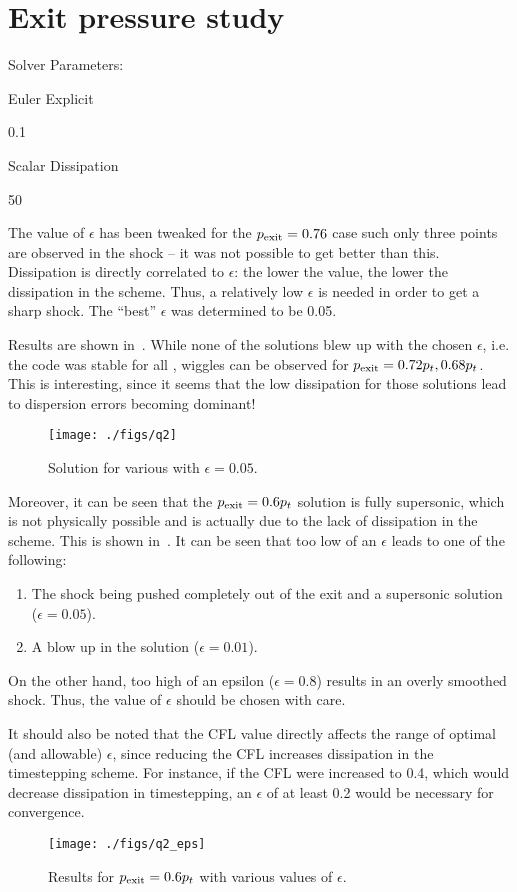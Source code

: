 \section{Exit pressure study}
Solver Parameters:
\begin{description}[noitemsep]
    \item[Timestepping Scheme:] Euler Explicit
    \item[CFL:] 0.1
    \item[Spatial Scheme:] Scalar Dissipation
    \item[Grid Points:] 50
\end{description}
The value of $\epsilon$ has been tweaked for the $p_{\mathrm{exit}} = 0.76$ case such only three points
are observed in the shock -- it was not possible to get better than this. Dissipation
is directly correlated to $\epsilon$: the lower the value, the lower the dissipation in the
scheme. Thus, a relatively low $\epsilon$ is needed in order to get a sharp shock. The
``best'' $\epsilon$ was determined to be 0.05.

Results are shown in~. While none of the solutions blew up with the chosen
$\epsilon$, i.e. the code was stable for all \pexit, wiggles can be observed for
$p_{\mathrm{exit}} = 0.72p_t, 0.68p_t$. This is interesting, since it seems that the low dissipation
for those solutions lead to dispersion errors becoming dominant!
\begin{figure}
    \centering
    \texttt{[image: ./figs/q2]}
    \caption{Solution for various \pexit with $\epsilon = 0.05$.}\label{fig:q2}
\end{figure}

Moreover, it can be seen that the $p_{\mathrm{exit}} = 0.6p_t$ solution is fully supersonic, which
is not physically possible and is actually due to the lack of dissipation in the scheme.
This is shown in~. It can be seen that too low of an $\epsilon$ leads to
one of the following:
\begin{enumerate}
    \item The shock being pushed completely out of the exit and a supersonic solution
        ($\epsilon = 0.05$).
    \item A blow up in the solution ($\epsilon = 0.01$).
\end{enumerate}
On the other hand, too high of an epsilon ($\epsilon = 0.8$) results in an overly smoothed
shock. Thus, the value of $\epsilon$ should be chosen with care.

It should also be noted that the CFL value directly affects the range of
optimal (and allowable) $\epsilon$, since reducing the CFL increases dissipation
in the timestepping scheme. For instance, if the CFL were increased to 0.4, which would
decrease dissipation in timestepping, an $\epsilon$ of at least 0.2 would be necessary
for convergence.
\begin{figure}
    \centering
    \texttt{[image: ./figs/q2\_eps]}
    \caption{Results for $p_{\mathrm{exit}} = 0.6p_t$ with various values of $\epsilon$.}
    \label{fig:q2_eps}
\end{figure}
